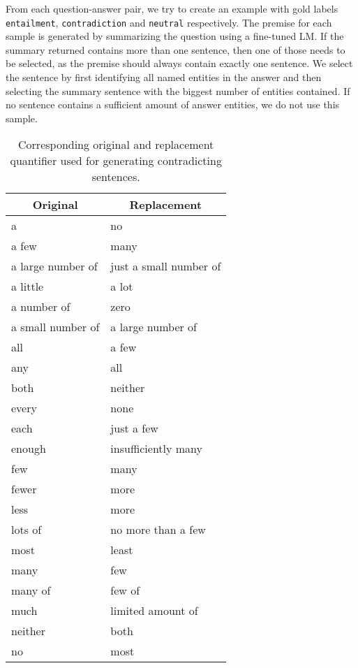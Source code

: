 From each question-answer pair, we try to create an example with gold labels \texttt{entailment}, \texttt{contradiction} and \texttt{neutral} respectively. The premise for each sample is generated by summarizing the question using a fine-tuned \ac{LM}. If the summary returned contains more than one sentence, then one of those needs to be selected, as the premise should always contain exactly one sentence. We select the sentence by first identifying all named entities in the answer and then selecting the summary sentence with the biggest number of entities contained. If no sentence contains a sufficient amount of answer entities, we do not use this sample.

\begin{table}[ht!]
    \centering
    \caption{Corresponding original and replacement quantifier used for generating contradicting sentences.}
    \small
    \begin{tabular}{l | l}
        \multicolumn{1}{c|}{Original} & \multicolumn{1}{c}{Replacement} \\
        \hline
        a &  no \\
        a few &  many \\
        a large number of &  just a small number of \\
        a little &  a lot \\
        a number of &  zero \\
        a small number of &  a large number of \\
        all &  a few \\
        any &  all \\
        both &  neither \\
        every &  none \\
        each &  just a few \\
        enough &  insufficiently many \\
        few &  many \\
        fewer &  more \\
        less &  more \\
        lots of &  no more than a few \\
        most &  least \\
        many &  few \\
        many of &  few of \\
        much &  limited amount of \\
        neither &  both \\
        no &  most \\

\end{tabular}
\end{table}
